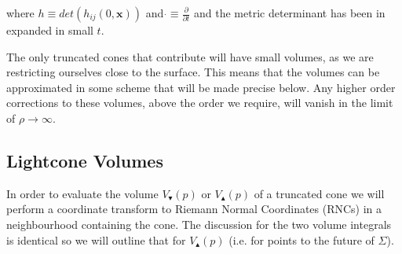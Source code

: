 \documentclass[12pt]{article}
\newcommand{\mb}[1]{\marginnote{\color{red}{\small MB:\,#1}}}
\begin{document}
where $h\equiv det\left(h_{ij}(0,\mathbf{x})\right)$ and $\dot{}\equiv \frac{\partial}{\partial t}$ and the metric determinant has been in expanded in small $t$.

The only truncated cones that contribute will have small volumes, as we are restricting ourselves close to the surface.
This means that the volumes can be approximated in some scheme that will be made precise below. Any higher order corrections to these volumes, above the order we require, will vanish in the limit of $\rho\rightarrow\infty$.

\subsection{Lightcone Volumes}

In order to evaluate the volume $V_\blacktriangledown(p)$ or $V_\blacktriangle(p)$ of a truncated cone we will perform a coordinate transform to Riemann Normal Coordinates (RNCs) in a neighbourhood containing the cone. The discussion for the two volume integrals is identical so we will outline that for $V_\blacktriangle(p)$ (i.e. for points to the future of $\Sigma$). 
\end{document}
